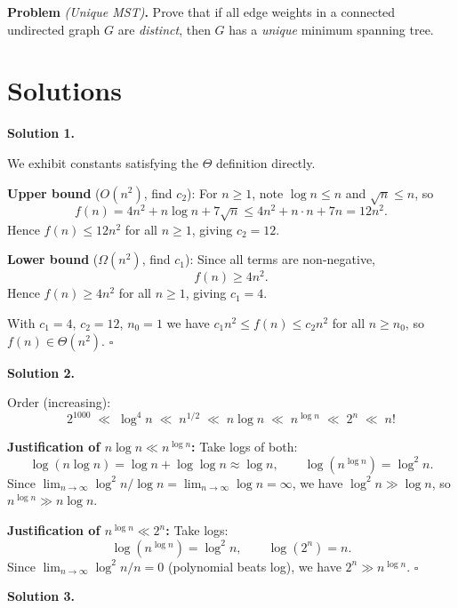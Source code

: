 \documentclass[10pt]{article}
\newcounter{prob}
\newcommand{\problem}[2]{%
  \stepcounter{prob}%
  \medskip\noindent\textbf{Problem \theprob} \textit{(#1)}\textbf{.} #2\par\smallskip
}
\begin{document}
\problem{Unique MST}{
Prove that if all edge weights in a connected undirected graph $G$ are \emph{distinct}, then $G$ has a \emph{unique} minimum spanning tree.
}

\newpage

\setcounter{prob}{0}

\section*{Solutions}

\noindent\textbf{Solution 1.}\par\smallskip

We exhibit constants satisfying the $\Theta$ definition directly.

\textbf{Upper bound} ($O(n^2)$, find $c_2$): For $n \ge 1$, note $\log n \le n$ and $\sqrt{n} \le n$, so
$$f(n) = 4n^2 + n\log n + 7\sqrt{n} \le 4n^2 + n \cdot n + 7n = 12n^2.$$
Hence $f(n) \le 12n^2$ for all $n \ge 1$, giving $c_2 = 12$.

\textbf{Lower bound} ($\Omega(n^2)$, find $c_1$): Since all terms are non-negative,
$$f(n) \ge 4n^2.$$
Hence $f(n) \ge 4n^2$ for all $n \ge 1$, giving $c_1 = 4$.

With $c_1 = 4$, $c_2 = 12$, $n_0 = 1$ we have $c_1 n^2 \le f(n) \le c_2 n^2$ for all $n \ge n_0$, so $f(n) \in \Theta(n^2)$. $\square$

\bigskip

\noindent\textbf{Solution 2.}\par\smallskip

Order (increasing):
$$2^{1000} \;\ll\; \log^4 n \;\ll\; n^{1/2} \;\ll\; n\log n \;\ll\; n^{\log n} \;\ll\; 2^n \;\ll\; n!$$

\textbf{Justification of $n\log n \ll n^{\log n}$:} Take logs of both:
$$\log(n\log n) = \log n + \log\log n \approx \log n, \qquad \log(n^{\log n}) = \log^2 n.$$
Since $\lim_{n\to\infty} \log^2 n / \log n = \lim_{n\to\infty}\log n = \infty$, we have $\log^2 n \gg \log n$, so $n^{\log n} \gg n\log n$.

\textbf{Justification of $n^{\log n} \ll 2^n$:} Take logs:
$$\log(n^{\log n}) = \log^2 n, \qquad \log(2^n) = n.$$
Since $\lim_{n\to\infty} \log^2 n / n = 0$ (polynomial beats log), we have $2^n \gg n^{\log n}$. $\square$

\bigskip

\noindent\textbf{Solution 3.}\par\smallskip
\end{document}
